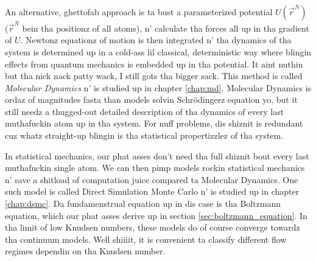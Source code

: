 An alternative, ghettofab approach is ta bust a parameterized potential $U(\vec r^N)$ ($\vec r^N$ bein tha positionz of all atoms), n' calculate tha forces all up in tha gradient of $U$. Newtonz equationz of motion is then integrated n' tha dynamics of tha system is determined up in a cold-ass lil classical, deterministic way where blingin effects from quantum mechanics is embedded up in tha potential. It aint nuthin but tha nick nack patty wack, I still gots tha bigger sack. This method is called \textit{Molecular Dynamics} n' is studied up in chapter \ref{chap:md}. Molecular Dynamics is ordaz of magnitudes fasta than models solvin Schr\"{o}dingerz equation yo, but it still needz a thugged-out detailed description of tha dynamics of every last muthafuckin atom up in tha system. For nuff problems, dis shiznit is redundant cuz whatz straight-up blingin is tha statistical propertizzlez of tha system. 

In statistical mechanics, our phat asses don't need tha full shiznit bout every last muthafuckin single atom. We can then pimp models rockin statistical mechanics n' save a shitload of computation juice compared ta Molecular Dynamics. One such model is called Direct Simulation Monte Carlo n' is studied up in chapter \ref{chap:dsmc}. Da fundamenstrual equation up in dis case is tha Boltzmann equation, which our phat asses derive up in section \ref{sec:boltzmann_equation}. In tha limit of low Knudsen numbers, these models do of course converge towardz tha continuum models. Well shiiiit, it is convenient ta classify different flow regimes dependin on tha Knudsen number.
